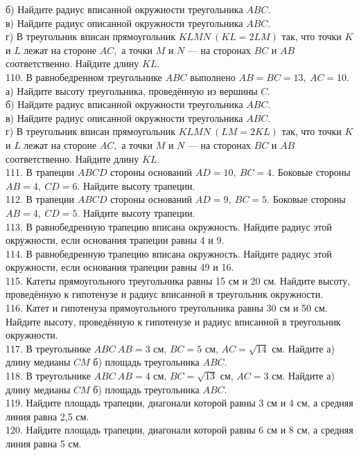 б) Найдите радиус вписанной окружности треугольника $ABC.$\\
в) Найдите радиус описанной окружности треугольника $ABC.$\\
г) В треугольник вписан прямоугольник $KLMN\ (KL=2LM)$ так, что точки $K$ и $L$ лежат на стороне $AC,$ а точки $M$ и $N$ --- на сторонах $BC$ и $AB$ соответственно. Найдите длину $KL.$\\
110. В равнобедренном треугольнике $ABC$ выполнено $AB=BC=13,\ AC=10.$\\
а) Найдите высоту треугольника, проведённую из вершины $C.$\\
б) Найдите радиус вписанной окружности треугольника $ABC.$\\
в) Найдите радиус описанной окружности треугольника $ABC.$\\
г) В треугольник вписан прямоугольник $KLMN\ (LM=2KL)$ так, что точки $K$ и $L$ лежат на стороне $AC,$ а точки $M$ и $N$ --- на сторонах $BC$ и $AB$ соответственно. Найдите длину $KL.$\\
111. В трапеции $ABCD$ стороны оснований $AD=10,\ BC=4.$ Боковые стороны $AB=4,\ CD=6.$ Найдите высоту трапеции.\\
112. В трапеции $ABCD$ стороны оснований $AD=9,\ BC=5.$ Боковые стороны $AB=4,\ CD=5.$ Найдите высоту трапеции.\\
113. В равнобедренную трапецию вписана окружность. Найдите радиус этой окружности, если основания трапеции равны 4 и 9.\\
114. В равнобедренную трапецию вписана окружность. Найдите радиус этой окружности, если основания трапеции равны 49 и 16.\\
115. Катеты прямоугольного треугольника равны 15 см и 20 см. Найдите высоту, проведённую к гипотенузе и радиус вписанной в треугольник окружности.\\
116. Катет и гипотенуза прямоугольного треугольника равны 30 см и 50 см. Найдите высоту, проведённую к гипотенузе и радиус вписанной в треугольник окружности.\\
117. В треугольнике $ABC\ AB=3$ см, $BC=5$ см, $AC=\sqrt{14}$ см. Найдите а) длину медианы $CM$ б) площадь треугольника $ABC.$\\
118. В треугольнике $ABC\ AB=4$ см, $BC=\sqrt{13}$ см, $AC=3$ см. Найдите а) длину медианы $CM$ б) площадь треугольника $ABC.$\\
119. Найдите площадь трапеции, диагонали которой равны 3 см и 4 см, а средняя линия равна 2,5 см.\\
120. Найдите площадь трапеции, диагонали которой равны 6 см и 8 см, а средняя линия равна 5 см.\\
